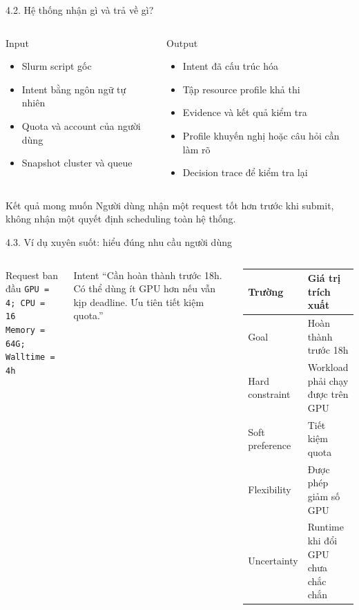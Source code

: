 \begin{frame}[t]{4.2. Hệ thống nhận gì và trả về gì?}
\small
\begin{columns}[T]
\begin{block}{Input}
\begin{itemize}
  \item Slurm script gốc
  \item Intent bằng ngôn ngữ tự nhiên
  \item Quota và account của người dùng
  \item Snapshot cluster và queue
\end{itemize}
\end{block}
\begin{block}{Output}
\begin{itemize}
  \item Intent đã cấu trúc hóa
  \item Tập resource profile khả thi
  \item Evidence và kết quả kiểm tra
  \item Profile khuyến nghị hoặc câu hỏi cần làm rõ
  \item Decision trace để kiểm tra lại
\end{itemize}
\end{block}
\end{columns}
\begin{exampleblock}{Kết quả mong muốn}
Người dùng nhận một request tốt hơn trước khi submit, không nhận một quyết định scheduling toàn hệ thống.
\end{exampleblock}
\end{frame}

\begin{frame}[t]{4.3. Ví dụ xuyên suốt: hiểu đúng nhu cầu người dùng}
\small
\begin{columns}[T]
\begin{block}{Request ban đầu}
\texttt{GPU = 4; CPU = 16}\\
\texttt{Memory = 64G; Walltime = 4h}
\end{block}
\begin{block}{Intent}
``Cần hoàn thành trước 18h. Có thể dùng ít GPU hơn nếu vẫn kịp deadline. Ưu tiên tiết kiệm quota.''
\end{block}
\begin{tabular}{@{}p{0.34\linewidth}p{0.60\linewidth}@{}}
\toprule
\textbf{Trường} & \textbf{Giá trị trích xuất} \\
\midrule
Goal & Hoàn thành trước 18h \\
Hard constraint & Workload phải chạy được trên GPU \\
Soft preference & Tiết kiệm quota \\
Flexibility & Được phép giảm số GPU \\
Uncertainty & Runtime khi đổi GPU chưa chắc chắn \\
\bottomrule
\end{tabular}
\end{columns}
\end{frame}

